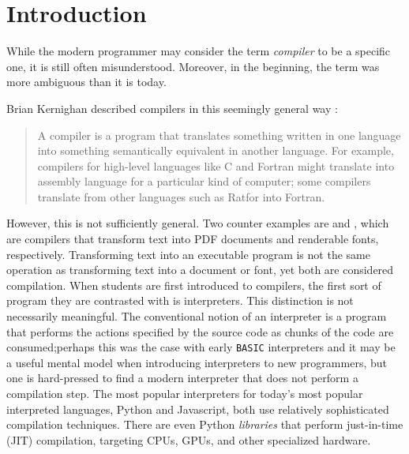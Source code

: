\chapter{Introduction}
While the modern programmer may consider the term \emph{compiler} to be a specific one,
it is still often misunderstood. Moreover, in the beginning, the term was more ambiguous than it is today.


Brian Kernighan described compilers in this seemingly general way
\cite{new-history-of-modern-computing}:

\begin{quotation}
	A compiler is a program that translates something written in one language
	into something semantically equivalent in another language. For example,
	compilers for high-level languages like C and Fortran might translate into
	assembly language for a particular kind of computer; some compilers translate
	from other languages such as Ratfor into Fortran.
\end{quotation}

However, this is not sufficiently general. Two counter examples are \tex and
\metafont, which are compilers that transform text into PDF documents and
renderable fonts, respectively. Transforming text into an executable program is
not the same operation as transforming text into a document or font, yet both
are considered compilation. When students are first introduced to compilers, the
first sort of program they are contrasted with is interpreters. This distinction
is not necessarily meaningful. The conventional notion of an interpreter is a
program that performs the actions specified by the source code as chunks of the
code are consumed;perhaps this was the case with early \texttt{BASIC}
interpreters and it may be a useful mental model when introducing interpreters
to new programmers, but one is hard-pressed to find a modern interpreter that
does not perform a compilation step. The most popular interpreters for today's
most popular interpreted languages, Python and Javascript, both use relatively
sophisticated compilation techniques. There are even Python \textit{libraries}
that perform just-in-time (JIT) compilation, targeting CPUs, GPUs, and other
specialized
hardware\cite{jax-compiler}\cite{lam-numba}\cite{numba_cuda}\cite{triton-tillet}.

